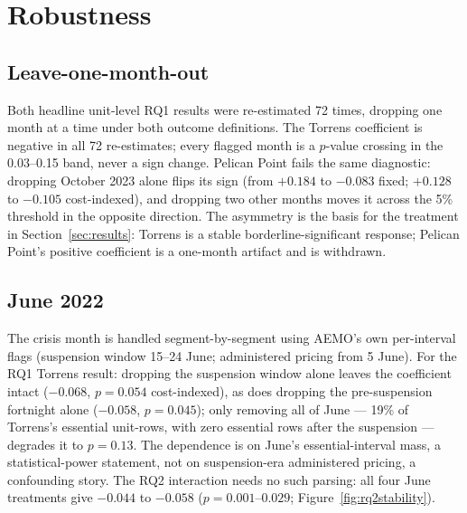 \section{Robustness}\label{sec:robustness}

\subsection{Leave-one-month-out}

Both headline unit-level RQ1 results were re-estimated 72 times, dropping one
month at a time under both outcome definitions. The Torrens coefficient is
negative in all 72 re-estimates; every flagged month is a $p$-value crossing
in the 0.03--0.15 band, never a sign change. Pelican Point fails the same
diagnostic: dropping October 2023 alone flips its sign (from $+0.184$ to
$-0.083$ fixed; $+0.128$ to $-0.105$ cost-indexed), and dropping two other
months moves it across the 5\% threshold in the opposite direction. The
asymmetry is the basis for the treatment in Section~\ref{sec:results}: Torrens
is a stable borderline-significant response; Pelican Point's positive
coefficient is a one-month artifact and is withdrawn.

\subsection{June 2022}

The crisis month is handled segment-by-segment using AEMO's own per-interval
flags (suspension window 15--24 June; administered pricing from 5 June). For
the RQ1 Torrens result: dropping the suspension window alone leaves the
coefficient intact ($-0.068$, $p=0.054$ cost-indexed), as does dropping the
pre-suspension fortnight alone ($-0.058$, $p=0.045$); only removing all of
June --- 19\% of Torrens's essential unit-rows, with zero essential rows after
the suspension --- degrades it to $p=0.13$. The dependence is on June's
essential-interval mass, a statistical-power statement, not on
suspension-era administered pricing, a confounding story. The RQ2 interaction
needs no such parsing: all four June treatments give $-0.044$ to $-0.058$
($p=0.001$--$0.029$; Figure~\ref{fig:rq2stability}).


